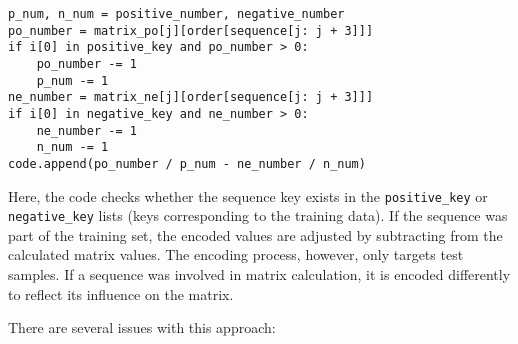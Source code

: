       \begin{lstlisting}[caption={Encoding Logic for Test Sequences},label={lst:encoding-pstnpss}]
p_num, n_num = positive_number, negative_number
po_number = matrix_po[j][order[sequence[j: j + 3]]]
if i[0] in positive_key and po_number > 0:
    po_number -= 1
    p_num -= 1
ne_number = matrix_ne[j][order[sequence[j: j + 3]]]
if i[0] in negative_key and ne_number > 0:
    ne_number -= 1
    n_num -= 1
code.append(po_number / p_num - ne_number / n_num)
      \end{lstlisting}

      Here, the code checks whether the sequence key exists in the \texttt{positive\_key} or \texttt{negative\_key} lists (keys corresponding to the training data).
      If the sequence was part of the training set, the encoded values are adjusted by subtracting from the calculated matrix values.
      The encoding process, however, only targets test samples.
      If a sequence was involved in matrix calculation, it is encoded differently to reflect its influence on the matrix.

      There are several issues with this approach:


